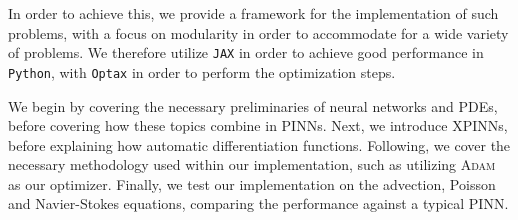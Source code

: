 In order to achieve this, we provide a framework for the implementation of such problems, with a focus on modularity in order to accommodate for a wide variety of problems.
We therefore utilize \verb|JAX| \cite{jax2018github} in order to achieve good performance in \verb|Python|, with \verb|Optax| \cite{deepmind2020jax} in order to perform the optimization steps.

We begin by covering the necessary preliminaries of neural networks and PDEs, before covering how these topics combine in PINNs.
Next, we introduce XPINNs, before explaining how automatic differentiation functions.
Following, we cover the necessary methodology used within our implementation, such as utilizing \textsc{Adam} as our optimizer.
Finally, we test our implementation on the advection, Poisson and Navier-Stokes equations, comparing the performance against a typical PINN.
